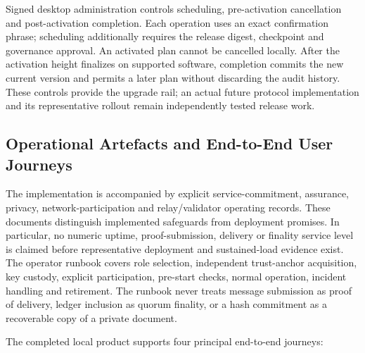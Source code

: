 Signed desktop administration controls scheduling, pre-activation cancellation
and post-activation completion.  Each operation uses an exact confirmation
phrase; scheduling additionally requires the release digest, checkpoint and
governance approval.  An activated plan cannot be cancelled locally.  After
the activation height finalizes on supported software, completion commits the
new current version and permits a later plan without discarding the audit
history.  These controls provide the upgrade rail; an actual future protocol
implementation and its representative rollout remain independently tested
release work.

\subsection{Operational Artefacts and End-to-End User Journeys}

The implementation is accompanied by explicit service-commitment, assurance,
privacy, network-participation and relay/validator operating records.  These
documents distinguish implemented safeguards from deployment promises.  In
particular, no numeric uptime, proof-submission, delivery or finality service
level is claimed before representative deployment and sustained-load evidence
exist.  The operator runbook covers role selection, independent trust-anchor
acquisition, key custody, explicit participation, pre-start checks, normal
operation, incident handling and retirement.  The runbook never treats message
submission as proof of delivery, ledger inclusion as quorum finality, or a hash
commitment as a recoverable copy of a private document.

The completed local product supports four principal end-to-end journeys:

